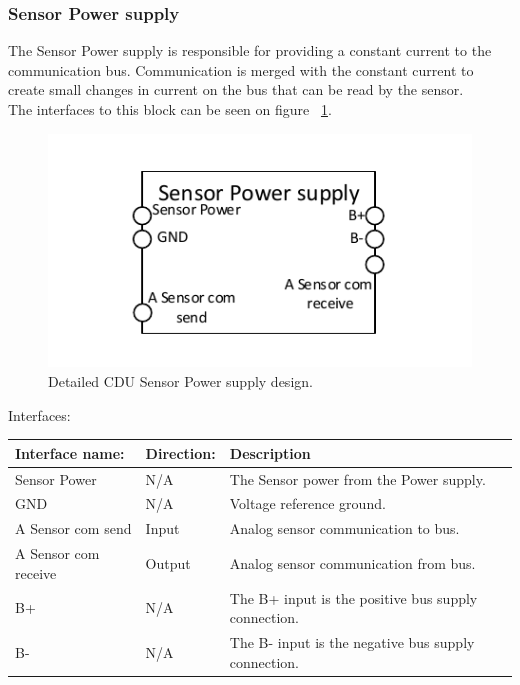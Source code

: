 \subsubsection{Sensor Power supply}
The Sensor Power supply is responsible for providing a constant current to the communication bus. Communication is merged with the constant current to create small changes in current on the bus that can be read by the sensor.\\
The interfaces to this block can be seen on figure ~\ref{fig:CDUSPS}.\\
\begin{figure}[H]
	\centering
	\includegraphics[scale=1]{billeder/CDUSPS}
	\caption{Detailed CDU Sensor Power supply design.}
	\label{fig:CDUSPS}
\end{figure}
Interfaces:
\begin{table}[H]
	\centering
	\begin{tabular}{|p{3cm} |p{3cm} | p{8cm}| }
		\hline
		Interface name: 	&Direction: & Description \\ \hline
		Sensor Power	 &N/A & The Sensor power from the Power supply. \\ \hline
		GND				&N/A & Voltage reference ground. \\\hline 
		A Sensor com send	&Input & Analog sensor communication to bus. \\\hline 
		A Sensor com receive	&Output & Analog sensor communication from bus. \\\hline
		B+ 				&N/A & The B+ input is the positive bus supply connection. \\ \hline
		B- 				&N/A & The B- input is the negative bus supply connection. \\ \hline
	\end{tabular}
\end{table}

